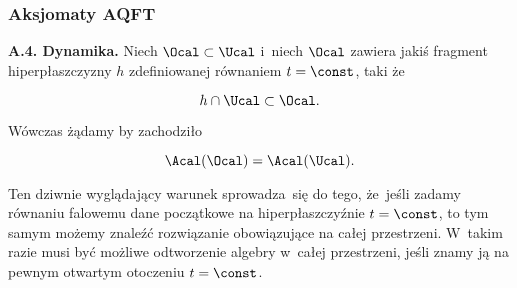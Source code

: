 \documentclass[10pt,t]{beamer}
\begin{document}
\begin{frame}
  \frametitle{Aksjomaty AQFT}




  \textbf{A.4. Dynamika.} Niech $\Ocal \subset \Ucal$ i~niech $\Ocal$
  zawiera jakiś fragment hiperpłaszczyzny $h$ zdefiniowanej równaniem
  $t = \const$, taki że

  \vspace{-1.5em}



  \begin{equation}
    \label{eq:Niespodziewane-teoretyczne-01}
    h \cap \Ucal \subset \Ocal.
  \end{equation}

  \vspace{-2em}



  Wówczas żądamy by zachodziło

  \vspace{-1.5em}



  \begin{equation}
    \label{eq:Niespodziewane-teoretyczne-01}
    \Acal( \Ocal ) = \Acal( \Ucal ).
  \end{equation}

  \vspace{-1.8em}



  Ten dziwnie wyglądający warunek sprowadza~się do tego, że~jeśli
  zadamy równaniu falowemu dane początkowe na hiperpłaszczyźnie
  $t = \const$, to tym samym możemy znaleźć rozwiązanie obowiązujące
  na całej przestrzeni. W~takim razie musi być możliwe odtworzenie
  algebry w~całej przestrzeni, jeśli znamy ją na pewnym otwartym otoczeniu
  $t = \const$.

\end{frame}
\end{document}
